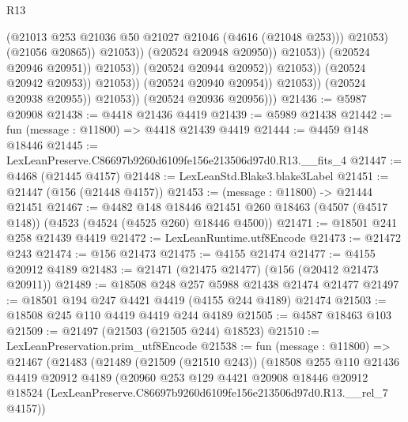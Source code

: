 \begin{lexlean}{R13}
\begin{coremodule}
                                                    (@21013
                                                      @253
                                                      @21036
                                                      @50
                                                      @21027
                                                      @21046
                                                      (@4616 (@21048 @253)))
                                                    @21053)
                                                  (@21056 @20865))
                                                @21053))
                                            (@20524 @20948 @20950))
                                          @21053))
                                      (@20524 @20946 @20951))
                                    @21053))
                                (@20524 @20944 @20952))
                              @21053))
                          (@20524 @20942 @20953))
                        @21053))
                    (@20524 @20940 @20954))
                  @21053))
              (@20524 @20938 @20955))
            @21053))
        (@20524 @20936 @20956)))
@21436 := @5987 @20908
@21438 := @4418 @21436 @4419
@21439 := @5989 @21438
@21442 := fun (message : @11800) => @4418 @21439 @4419
@21444 := @4459 @148 @18446
@21445 := LexLeanPreserve.C86697b9260d6109fe156e213506d97d0.R13.__fits_4
@21447 := @4468 (@21445 @4157)
@21448 := LexLeanStd.Blake3.blake3Label
@21451 := @21447 (@156 (@21448 @4157))
@21453 := (message : @11800) -> @21444 @21451
@21467 := @4482
    @148
    @18446
    @21451
    @260
    @18463
    (@4507 (@4517 @148))
    (@4523 (@4524 (@4525 @260) @18446 @4500))
@21471 := @18501 @241 @258 @21439 @4419
@21472 := LexLeanRuntime.utf8Encode
@21473 := @21472 @243
@21474 := @156 @21473
@21475 := @4155 @21474
@21477 := @4155 @20912 @4189
@21483 := @21471 (@21475 @21477) (@156 (@20412 @21473 @20911))
@21489 := @18508 @248 @257 @5988 @21438 @21474 @21477
@21497 := @18501 @194 @247 @4421 @4419 (@4155 @244 @4189) @21474
@21503 := @18508 @245 @110 @4419 @4419 @244 @4189
@21505 := @4587 @18463 @103
@21509 := @21497 (@21503 (@21505 @244) @18523)
@21510 := LexLeanPreservation.prim_utf8Encode
@21538 := fun (message : @11800) =>
  @21467
    (@21483
      (@21489
        (@21509 (@21510 @243))
        (@18508
          @255
          @110
          @21436
          @4419
          @20912
          @4189
          (@20960
            @253
            @129
            @4421
            @20908
            @18446
            @20912
            @18524
            (LexLeanPreserve.C86697b9260d6109fe156e213506d97d0.R13.__rel_7 @4157))

\end{coremodule}
\end{lexlean}
